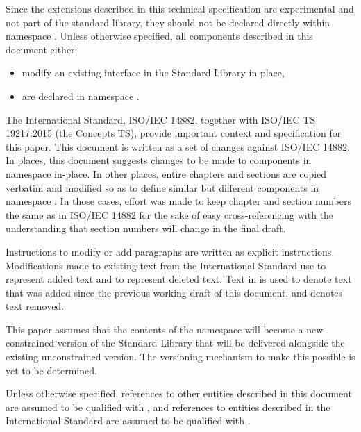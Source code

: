 \pnum
Since the extensions described in this technical specification are experimental and not
part of the \Cpp standard library, they should not be declared directly within namespace
. Unless otherwise specified, all components described in this document either:

\begin{itemize}
\item modify an existing interface in the \Cpp Standard Library in-place,
\item are declared in namespace .
\end{itemize}


\pnum
The International Standard, ISO/IEC 14882, together with ISO/IEC TS 19217:2015 (the Concepts TS),
provide important context and specification for this paper. This document is written
as a set of changes against ISO/IEC 14882. In places, this document suggests
changes to be made to components in namespace  in-place. In
other places, entire chapters and sections are copied verbatim and modified so as to
define similar but different components in namespace .
In those cases, effort was made to keep chapter and section numbers the same as in
ISO/IEC 14882 for the sake of easy cross-referencing with the understanding that
section numbers will change in the final draft.

\pnum
Instructions to modify or add paragraphs are written as explicit instructions.
Modifications made to existing text from the International Standard use
 to represent added text and  to
represent deleted text. Text in  is used to denote text that
was added since the previous working draft of this document, and 
denotes text removed.

\pnum
This paper assumes that the contents of the 
namespace will become a new constrained version of the \Cpp Standard Library
that will be delivered alongside the existing unconstrained version. The versioning
mechanism to make this possible is yet to be determined.

\pnum
Unless otherwise specified, references to other entities described in this
document are assumed to be qualified with , and
references to entities described in the International Standard are assumed to be
qualified with .

